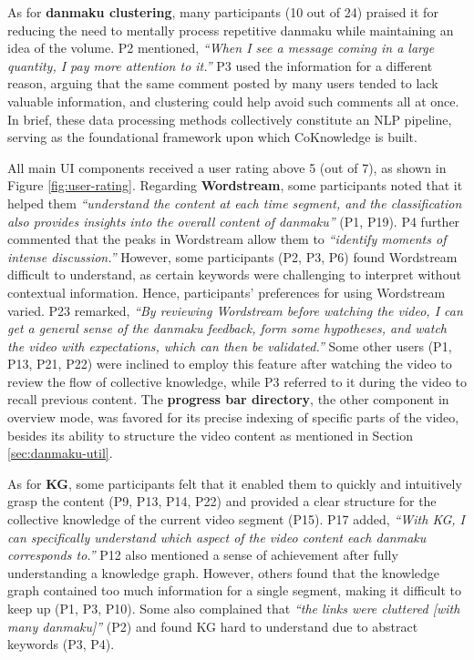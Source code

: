 As for \textbf{danmaku clustering}, many participants (10 out of 24) praised it for reducing the need to mentally process repetitive danmaku while maintaining an idea of the volume. 
P2 mentioned, \textit{``When I see a message coming in a large quantity, I pay more attention to it.''} P3 used the information for a different reason, arguing that the same comment posted by many users tended to lack valuable information, and clustering could help avoid such comments all at once. %
In brief, these data processing methods collectively constitute an NLP pipeline, serving as the foundational framework upon which CoKnowledge is built.


All main UI components received a user rating above 5 (out of 7), as shown in Figure \ref{fig:user-rating}. 
Regarding \textbf{Wordstream}, some participants noted that it helped them \textit{``understand the content at each time segment, and the classification also provides insights into the overall content of danmaku''} (P1, P19). P4 further commented that the peaks in Wordstream allow them to \textit{``identify moments of intense discussion.''} However, some participants (P2, P3, P6) found Wordstream difficult to understand, as certain keywords were challenging to interpret without contextual information.
Hence, participants' preferences for using Wordstream varied. P23 remarked, \textit{``By reviewing Wordstream before watching the video, I can get a general sense of the danmaku feedback, form some hypotheses, and watch the video with expectations, which can then be validated.''} Some other users (P1, P13, P21, P22) were inclined to employ this feature after watching the video to review the flow of collective knowledge, while P3 referred to it during the video to recall previous content.
The \textbf{progress bar directory}, the other component in overview mode, was favored for its precise indexing of specific parts of the video, besides its ability to structure the video content as mentioned in Section \ref{sec:danmaku-util}. 
 
As for \textbf{KG}, some participants felt that it enabled them to quickly and intuitively grasp the content (P9, P13, P14, P22) and provided a clear structure for the collective knowledge of the current video segment (P15). P17 added, \textit{``With KG, I can specifically understand which aspect of the video content each danmaku corresponds to.''} P12 also mentioned a sense of achievement after fully understanding a knowledge graph. However, others found that the knowledge graph contained too much information for a single segment, making it difficult to keep up (P1, P3, P10). Some also complained that \textit{``the links were cluttered [with many danmaku]''} (P2) and found KG hard to understand due to abstract keywords (P3, P4).

